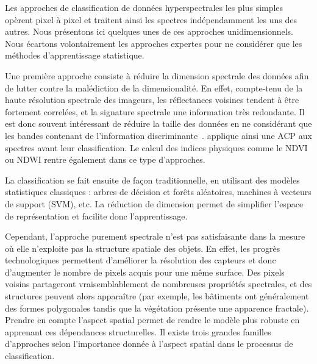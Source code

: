 Les approches de classification de données hyperspectrales les plus simples opèrent pixel à pixel et traitent ainsi les spectres indépendamment les uns des autres. Nous présentons ici quelques unes de ces approches unidimensionnels. Nous écartons volontairement les approches expertes pour ne considérer que les méthodes d'apprentissage statistique.

Une première approche consiste à réduire la dimension spectrale des données afin de lutter contre la malédiction de la dimensionalité. En effet, compte-tenu de la haute résolution spectrale des imageurs, les réflectances voisines tendent à être fortement correlées, et la signature spectrale une information très redondante. Il est donc souvent intéressant de réduire la taille des données en ne considérant que les bandes contenant de l'information discriminante~\cite{le_bris_extraction_2015,bevilacqua_unsupervised_2017}. \citet{rodarmel_principal_2002} applique ainsi une \gls{ACP} aux spectres avant leur classification. Le calcul des indices physiques comme le \gls{NDVI} ou \gls{NDWI} rentre également dans ce type d'approches.

La classification se fait ensuite de façon traditionnelle, en utilisant des modèles statistiques classiques : arbres de décision et forêts aléatoires, machines à vecteurs de support (SVM), etc. La réduction de dimension permet de simplifier l'espace de représentation et facilite donc l'apprentissage.

Cependant, l'approche purement spectrale n'est pas satisfaisante dans la mesure où elle n'exploite pas la structure spatiale des objets. En effet, les progrès technologiques permettent d'améliorer la résolution des capteurs et donc d'augmenter le nombre de pixels acquis pour une même surface. Des pixels voisins partageront vraisemblablement de nombreuses propriétés spectrales, et des structures peuvent alors apparaître (par exemple, les bâtiments ont généralement des formes polygonales tandis que la végétation présente une apparence fractale). Prendre en compte l'aspect spatial permet de rendre le modèle plus robuste en apprenant ces dépendances structurelles. Il existe trois grandes familles d'approches selon l'importance donnée à l'aspect spatial dans le processus de classification.

